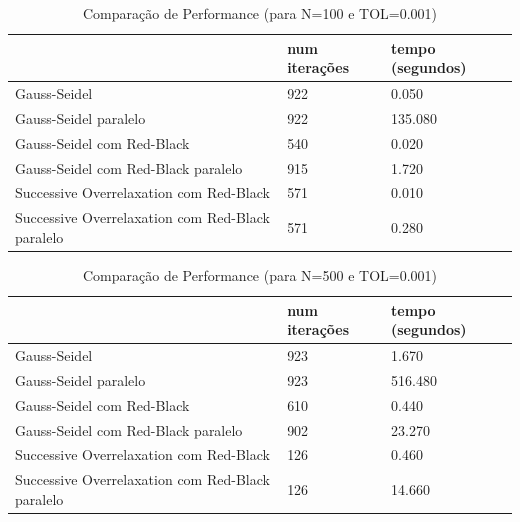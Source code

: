 \documentclass[a4paper]{report}
\begin{document}
\begin{table}[h]
\centering
\begin{tabular}{|l|l|l|}
\hline
                                                 & num iterações & tempo (segundos) \\ \hline
Gauss-Seidel                                     & 922           & 0.050               \\ \hline
Gauss-Seidel paralelo                            & 922           & 135.080               \\ \hline
Gauss-Seidel com Red-Black                       & 540           & 0.020               \\ \hline
Gauss-Seidel com Red-Black paralelo              & 915           & 1.720               \\ \hline
Successive Overrelaxation com Red-Black          & 571           & 0.010               \\ \hline
Successive Overrelaxation com Red-Black paralelo & 571           & 0.280               \\ \hline
\end{tabular}
\caption{Comparação de Performance (para N=100 e TOL=0.001)}
\label{tab:tempo}
\end{table}

\begin{table}[h]
\centering
\begin{tabular}{|l|l|l|}
\hline
                                                 & num iterações & tempo (segundos) \\ \hline
Gauss-Seidel                                     & 923           & 1.670            \\ \hline
Gauss-Seidel paralelo                            & 923           & 516.480          \\ \hline
Gauss-Seidel com Red-Black                       & 610           & 0.440               \\ \hline
Gauss-Seidel com Red-Black paralelo              & 902           & 23.270               \\ \hline
Successive Overrelaxation com Red-Black          & 126           & 0.460            \\ \hline
Successive Overrelaxation com Red-Black paralelo & 126           & 14.660           \\ \hline
\end{tabular}
\caption{Comparação de Performance (para N=500 e TOL=0.001)}
\label{tab:tempo}
\end{table}
\end{document}
